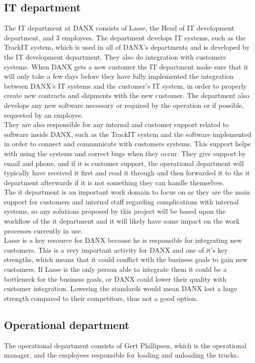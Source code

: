 \subsection{IT department}
The IT department at DANX consists of Lasse, the Head of IT development department, and 3 employees. The department develops IT systems, such as the TrackIT system, which is used in all of DANX's departments and is developed by the IT development department. They also do integration with customers systems. When DANX gets a new customer the IT department make sure that it will only take a few days before they have fully implemented the integration between DANX’s IT systems and the customer’s IT system, in order to properly create new contracts and shipments with the new customer. The department also develops any new software necessary or required by the operation or if possible, requested by an employee. \\
They are also responsible for any internal and customer support related to software inside DANX, such as the TrackIT system and the software implemented in order to connect and communicate with customers systems. This support helps with using the systems and correct bugs when they occur. They give support by email and phone, and if it is customer support, the operational department will typically have received it first and read it through and then forwarded it to the it department afterwards if it is not something they can handle themselves. \\
The it department is an important work domain to focus on as they are the main support for customers and internal staff regarding complications with internal systems, so any solutions proposed by this project will be based upon the workflow of the it department and it will likely have some impact on the work processes currently in use.
\\
Lasse is a key resource for DANX because he is responsible for integrating new customers. This is a very important activity for DANX and one of it’s key strengths, which means that it could conflict with the business goals to gain new customers. If Lasse is the only person able to integrate them it could be a bottleneck for the business goals, or DANX could lower their quality with customer integration. Lowering the standards would mean DANX lost a huge strength compared to their competitors, thus not a good option.


\subsection{Operational department}
The operational department consists of Gert Phillipsen, which is the operational manager, and the employees responsible for loading and unloading the trucks.\\
 
